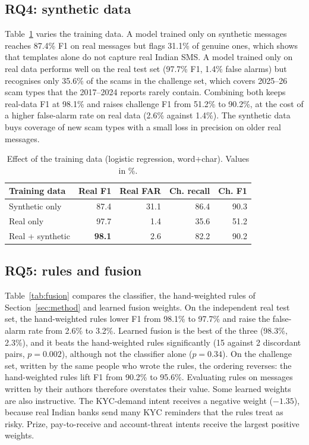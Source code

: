 \documentclass[conference]{IEEEtran}
\begin{document}
\subsection{RQ4: synthetic data}
Table~\ref{tab:train} varies the training data. A model trained only on synthetic messages reaches 87.4\% F1 on real messages but flags 31.1\% of genuine ones, which shows that templates alone do not capture real Indian SMS. A model trained only on real data performs well on the real test set (97.7\% F1, 1.4\% false alarms) but recognises only 35.6\% of the scams in the challenge set, which covers 2025--26 scam types that the 2017--2024 reports rarely contain. Combining both keeps real-data F1 at 98.1\% and raises challenge F1 from 51.2\% to 90.2\%, at the cost of a higher false-alarm rate on real data (2.6\% against 1.4\%). The synthetic data buys coverage of new scam types with a small loss in precision on older real messages.

\begin{table}[t]
\centering
\caption{Effect of the training data (logistic regression, word+char). Values in \%.}
\label{tab:train}
\footnotesize
\begin{tabular}{@{}lrrrr@{}}
\toprule
Training data & Real F1 & Real FAR & Ch. recall & Ch. F1 \\
\midrule
Synthetic only & 87.4 & 31.1 & 86.4 & 90.3 \\
Real only & 97.7 & 1.4 & 35.6 & 51.2 \\
Real + synthetic & \textbf{98.1} & 2.6 & 82.2 & 90.2 \\
\bottomrule
\end{tabular}
\end{table}

\subsection{RQ5: rules and fusion}
Table~\ref{tab:fusion} compares the classifier, the hand-weighted rules of Section~\ref{sec:method} and learned fusion weights. On the independent real test set, the hand-weighted rules lower F1 from 98.1\% to 97.7\% and raise the false-alarm rate from 2.6\% to 3.2\%. Learned fusion is the best of the three (98.3\%, 2.3\%), and it beats the hand-weighted rules significantly (15 against 2 discordant pairs, $p=0.002$), although not the classifier alone ($p=0.34$). On the challenge set, written by the same people who wrote the rules, the ordering reverses: the hand-weighted rules lift F1 from 90.2\% to 95.6\%. Evaluating rules on messages written by their authors therefore overstates their value. Some learned weights are also instructive. The KYC-demand intent receives a negative weight ($-1.35$), because real Indian banks send many KYC reminders that the rules treat as risky. Prize, pay-to-receive and account-threat intents receive the largest positive weights.
\end{document}
